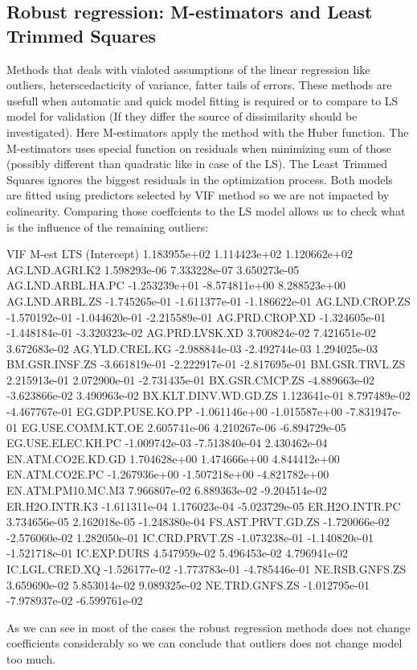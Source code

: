 \documentclass[a4paper]{article}
\begin{document}
\subsection{Robust regression: M-estimators and Least Trimmed Squares}
Methods that deals with vialoted assumptions of the linear regression like
outliers, heterscedacticity of variance, fatter tails of errors. These
methods are usefull when automatic and quick model fitting is required or
to compare to LS model for validation (If they differ the source of
dissimilarity should be investigated). Here M-estimators apply the method with
the Huber function.
The M-estimators uses special function on residuals when minimizing sum of those (possibly different
than quadratic like in case of the LS). The Least Trimmed Squares ignores the
biggest residuals in the optimization process.  Both models are fitted using
predictors selected by VIF method so we are not impacted by colinearity.  
Comparing those coeffcients to the LS model allows us to check what is the
influence of the remaining outliers:
\begin{Schunk}
\begin{Soutput}
                               VIF         M-est           LTS
(Intercept)           1.183955e+02  1.114423e+02  1.120662e+02
AG.LND.AGRI.K2        1.598293e-06  7.333228e-07  3.650273e-05
AG.LND.ARBL.HA.PC    -1.253239e+01 -8.574811e+00  8.288523e+00
AG.LND.ARBL.ZS       -1.745265e-01 -1.611377e-01 -1.186622e-01
AG.LND.CROP.ZS       -1.570192e-01 -1.044620e-01 -2.215589e-01
AG.PRD.CROP.XD       -1.324605e-01 -1.448184e-01 -3.320323e-02
AG.PRD.LVSK.XD        3.700824e-02  7.421651e-02  3.672683e-02
AG.YLD.CREL.KG       -2.988844e-03 -2.492744e-03  1.294025e-03
BM.GSR.INSF.ZS       -3.661819e-01 -2.222917e-01 -2.817695e-01
BM.GSR.TRVL.ZS        2.215913e-01  2.072900e-01 -2.731435e-01
BX.GSR.CMCP.ZS       -4.889663e-02 -3.623866e-02  3.490963e-02
BX.KLT.DINV.WD.GD.ZS  1.123641e-01  8.797489e-02 -4.467767e-01
EG.GDP.PUSE.KO.PP    -1.061146e+00 -1.015587e+00 -7.831947e-01
EG.USE.COMM.KT.OE     2.605741e-06  4.210267e-06 -6.894729e-05
EG.USE.ELEC.KH.PC    -1.009742e-03 -7.513840e-04  2.430462e-04
EN.ATM.CO2E.KD.GD     1.704628e+00  1.474666e+00  4.844412e+00
EN.ATM.CO2E.PC       -1.267936e+00 -1.507218e+00 -4.821782e+00
EN.ATM.PM10.MC.M3     7.966807e-02  6.889363e-02 -9.204514e-02
ER.H2O.INTR.K3       -1.611311e-04  1.176023e-04 -5.023729e-05
ER.H2O.INTR.PC        3.734656e-05  2.162018e-05 -1.248380e-04
FS.AST.PRVT.GD.ZS    -1.720066e-02 -2.576060e-02  1.282050e-01
IC.CRD.PRVT.ZS       -1.073238e-01 -1.140820e-01 -1.521718e-01
IC.EXP.DURS           4.547959e-02  5.496453e-02  4.796941e-02
IC.LGL.CRED.XQ       -1.526177e-02 -1.773783e-01 -4.785446e-01
NE.RSB.GNFS.ZS        3.659690e-02  5.853014e-02  9.089325e-02
NE.TRD.GNFS.ZS       -1.012795e-01 -7.978937e-02 -6.599761e-02
\end{Soutput}
\end{Schunk}
As we can see in most of the cases the robust regression methods does not change
coefficients considerably so we can conclude that outliers does not change model
too much.
\end{document}
